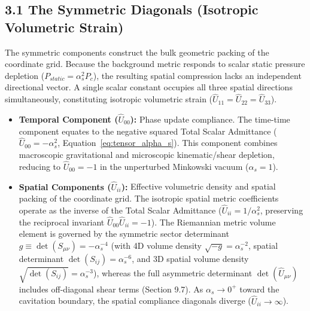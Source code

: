 \subsection*{3.1 The Symmetric Diagonals (Isotropic Volumetric Strain)}
The symmetric components construct the bulk geometric packing of the coordinate grid. Because the background metric responds to scalar static pressure depletion ($P_{static} = \alpha_s^2 P_c$), the resulting spatial compression lacks an independent directional vector. A single scalar constant occupies all three spatial directions simultaneously, constituting isotropic volumetric strain ($\hat{U}_{11} = \hat{U}_{22} = \hat{U}_{33}$). %
\begin{itemize}[leftmargin=*]
    \item \textbf{Temporal Component ($\hat{U}_{00}$):} Phase update compliance. The time-time component equates to the negative squared Total Scalar Admittance ($\hat{U}_{00} = -\alpha_s^2$, Equation~\ref{eq:tensor_alpha_s}). This component combines macroscopic gravitational and microscopic kinematic/shear depletion, reducing to $\hat{U}_{00} = -1$ in the unperturbed Minkowski vacuum ($\alpha_s = 1$). %
    \item \textbf{Spatial Components ($\hat{U}_{ii}$):} Effective volumetric density and spatial packing of the coordinate grid. The isotropic spatial metric coefficients operate as the inverse of the Total Scalar Admittance ($\hat{U}_{ii} = 1/\alpha_s^2$, preserving the reciprocal invariant $\hat{U}_{00}\hat{U}_{ii} = -1$). The Riemannian metric volume element is governed by the symmetric sector determinant $g \equiv \det(S_{\mu\nu}) = -\alpha_s^{-4}$ (with 4D volume density $\sqrt{-g} = \alpha_s^{-2}$, spatial determinant $\det(S_{ij}) = \alpha_s^{-6}$, and 3D spatial volume density $\sqrt{\det(S_{ij})} = \alpha_s^{-3}$), whereas the full asymmetric determinant $\det(\hat{U}_{\mu\nu})$ includes off-diagonal shear terms (Section 9.7). As $\alpha_s \to 0^+$ toward the cavitation boundary, the spatial compliance diagonals diverge ($\hat{U}_{ii} \to \infty$). %
\end{itemize}

